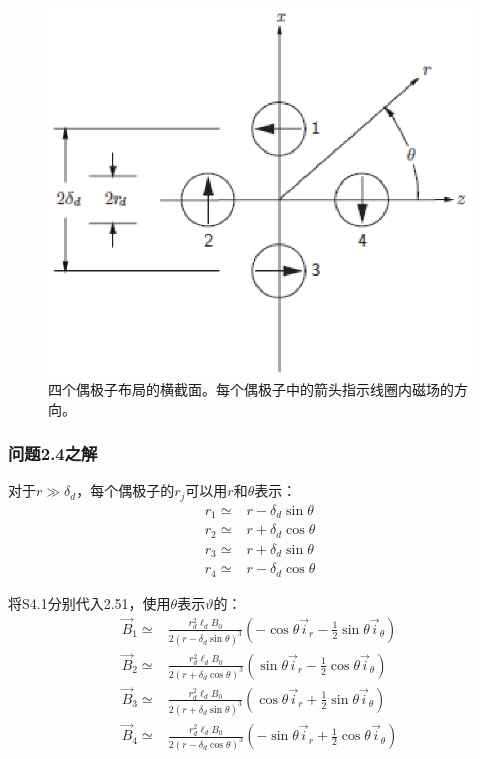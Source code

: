 \begin{figure}[htbp]
  \centering
 \includegraphics[scale=0.9]{chpt2/figs/fig2.7.eps}
  \caption{四个偶极子布局的横截面。每个偶极子中的箭头指示线圈内磁场的方向。}
\end{figure}


\subsubsection*{问题2.4之解}
对于$r\gg \delta_d$，每个偶极子的$r_j$可以用$r$和$\theta$表示：
\begin{align}
r_1\simeq& r-\delta_d \sin\theta \nonumber\tag{S4.1a}\\
r_2\simeq& r+\delta_d \cos\theta\nonumber\tag{S4.1b}\\
r_3\simeq& r+\delta_d \sin\theta\nonumber\tag{S4.1c}\\
r_4\simeq& r-\delta_d \cos\theta\nonumber\tag{S4.1d}
\end{align}

将S4.1分别代入2.51，使用$\theta$表示$\vartheta$的：
\begin{align}
\vec{B}_1 \simeq& \frac{r_d^2 \ell_d B_0}{2(r-\delta_d\sin\theta)^3}(-\cos\theta \vec{i}_r-\frac{1}{2}\sin\theta \vec{i}_\theta) \nonumber\tag{S4.2a}\\
\vec{B}_2 \simeq& \frac{r_d^2 \ell_d B_0}{2(r+\delta_d\cos\theta)^3}(\sin\theta \vec{i}_r-\frac{1}{2}\cos\theta \vec{i}_\theta)  \nonumber\tag{S4.2b}\\
\vec{B}_3 \simeq& \frac{r_d^2 \ell_d B_0}{2(r+\delta_d\sin\theta)^3}(\cos\theta \vec{i}_r+\frac{1}{2}\sin\theta \vec{i}_\theta) \nonumber\tag{S4.2c}\\
\vec{B}_4 \simeq& \frac{r_d^2 \ell_d B_0}{2(r-\delta_d\cos\theta)^3}(-\sin\theta \vec{i}_r+\frac{1}{2}\cos\theta \vec{i}_\theta)  \nonumber\tag{S4.2d}
\end{align}

